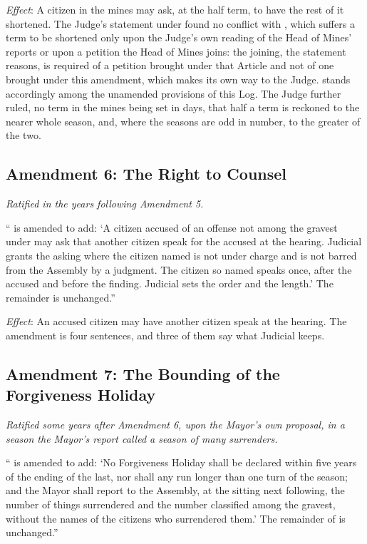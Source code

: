 \textit{Effect}: A citizen in the mines may ask, at the half term, to have the rest of it shortened. The Judge's statement under  found no conflict with , which suffers a term to be shortened only upon the Judge's own reading of the Head of Mines' reports or upon a petition the Head of Mines joins: the joining, the statement reasons, is required of a petition brought under that Article and not of one brought under this amendment, which makes its own way to the Judge.  stands accordingly among the unamended provisions of this Log. The Judge further ruled, no term in the mines being set in days, that half a term is reckoned to the nearer whole season, and, where the seasons are odd in number, to the greater of the two.

\subsection*{Amendment 6: The Right to Counsel}

\textit{Ratified in the years following Amendment 5.}

`` is amended to add: `A citizen accused of an offense not among the gravest under  may ask that another citizen speak for the accused at the hearing. Judicial grants the asking where the citizen named is not under charge and is not barred from the Assembly by a judgment. The citizen so named speaks once, after the accused and before the finding. Judicial sets the order and the length.' The remainder is unchanged.''

\textit{Effect}: An accused citizen may have another citizen speak at the hearing. The amendment is four sentences, and three of them say what Judicial keeps.

\subsection*{Amendment 7: The Bounding of the Forgiveness Holiday}

\textit{Ratified some years after Amendment 6, upon the Mayor's own proposal, in a season the Mayor's report called a season of many surrenders.}

`` is amended to add: `No Forgiveness Holiday shall be declared within five years of the ending of the last, nor shall any run longer than one turn of the season; and the Mayor shall report to the Assembly, at the sitting next following, the number of things surrendered and the number classified among the gravest, without the names of the citizens who surrendered them.' The remainder of  is unchanged.''

